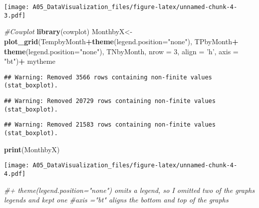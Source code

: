 \documentclass[]{article}
\newenvironment{Shaded}{\begin{snugshade}}{\end{snugshade}}
\newcommand{\CommentTok}[1]{\textcolor[rgb]{0.56,0.35,0.01}{\textit{#1}}}
\newcommand{\DataTypeTok}[1]{\textcolor[rgb]{0.13,0.29,0.53}{#1}}
\newcommand{\DecValTok}[1]{\textcolor[rgb]{0.00,0.00,0.81}{#1}}
\newcommand{\KeywordTok}[1]{\textcolor[rgb]{0.13,0.29,0.53}{\textbf{#1}}}
\newcommand{\NormalTok}[1]{#1}
\newcommand{\OperatorTok}[1]{\textcolor[rgb]{0.81,0.36,0.00}{\textbf{#1}}}
\newcommand{\StringTok}[1]{\textcolor[rgb]{0.31,0.60,0.02}{#1}}
\begin{document}
\texttt{[image: A05\_DataVisualization\_files/figure-latex/unnamed-chunk-4-3.pdf]}

\begin{Shaded}
\begin{Highlighting}[]
\CommentTok{#Cowplot}
\KeywordTok{library}\NormalTok{(cowplot)}
\NormalTok{MonthbyX<-}\KeywordTok{plot_grid}\NormalTok{(TempbyMonth}\OperatorTok{+}\KeywordTok{theme}\NormalTok{(}\DataTypeTok{legend.position=}\StringTok{"none"}\NormalTok{), }
\NormalTok{                    TPbyMonth}\OperatorTok{+}\StringTok{ }\KeywordTok{theme}\NormalTok{(}\DataTypeTok{legend.position=}\StringTok{"none"}\NormalTok{), }
\NormalTok{                    TNbyMonth, }
                    \DataTypeTok{nrow =} \DecValTok{3}\NormalTok{, }\DataTypeTok{align =} \StringTok{'h'}\NormalTok{, }\DataTypeTok{axis =} \StringTok{"bt"}\NormalTok{)}\OperatorTok{+}\StringTok{ }\NormalTok{mytheme}
\end{Highlighting}
\end{Shaded}

\begin{verbatim}
## Warning: Removed 3566 rows containing non-finite values (stat_boxplot).
\end{verbatim}

\begin{verbatim}
## Warning: Removed 20729 rows containing non-finite values (stat_boxplot).
\end{verbatim}

\begin{verbatim}
## Warning: Removed 21583 rows containing non-finite values (stat_boxplot).
\end{verbatim}

\begin{Shaded}
\begin{Highlighting}[]
\KeywordTok{print}\NormalTok{(MonthbyX)}
\end{Highlighting}
\end{Shaded}

\texttt{[image: A05\_DataVisualization\_files/figure-latex/unnamed-chunk-4-4.pdf]}

\begin{Shaded}
\begin{Highlighting}[]
\CommentTok{#+ theme(legend.position="none") omits a legend, so I omitted two of the graphs legends and kept one}
\CommentTok{#axis ="bt" aligns the bottom and top of the graphs}
\end{Highlighting}
\end{Shaded}
\end{document}
